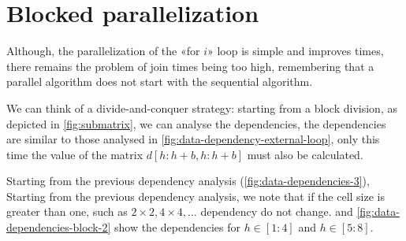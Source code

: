 \section{Blocked parallelization}\label{blocked_parallelization}

Although, the parallelization of the «for \(i\)» loop is simple and improves times, there remains the problem of join times being too high, remembering that a parallel algorithm does not start with the sequential algorithm.

We can think of a divide-and-conquer strategy: starting from a block division, as depicted in \cref{fig:submatrix}, we can analyse the dependencies, the dependencies are similar to those analysed in \cref{fig:data-dependency-external-loop}, only this time the value of the matrix \(d[h:h+b,h:h+b]\) must also be calculated.

Starting from the previous dependency analysis (\cref{fig:data-dependencies-3}), Starting from the previous dependency analysis, we note that if the cell size is greater than one, such as  \(  2 \times 2,  4 \times 4, \dots\) dependency do not change.
 and \ref{fig:data-dependencies-block-2} show the dependencies for \(h \in [1:4]\) and \(h \in [5:8]\).

